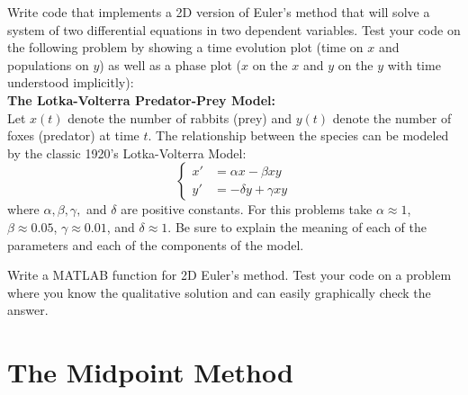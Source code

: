 \begin{problem}\label{prob:2dPredPrey}
    Write code that implements a 2D version of Euler's method that will solve a system of
    two differential equations in two dependent variables.  Test your code on the
    following problem by showing a time evolution plot (time on $x$ and populations on
    $y$) as well as a phase plot ($x$ on the $x$ and $y$ on the $y$ with time understood
    implicitly):\\
    {\bf The Lotka-Volterra Predator-Prey Model:}\\
    Let $x(t)$ denote the number of rabbits (prey) and $y(t)$ denote the number of foxes
    (predator) at time $t$.  The relationship between the species can be modeled by the
    classic 1920's Lotka-Volterra Model:
    \[ \left\{ \begin{array}{ll} x' &= \alpha x - \beta xy \\ y' &= -\delta y + \gamma xy
        \end{array} \right. \]
    where $\alpha, \beta, \gamma,$ and $\delta$ are positive constants.  For this
    problems take $\alpha \approx 1$, $\beta \approx 0.05$, $\gamma \approx 0.01$, and
    $\delta \approx 1$.  Be sure to explain the meaning of each of the parameters and each
    of the components of the model.
\end{problem}


\begin{problem}
    Write a MATLAB function for 2D Euler's method.  Test your code on a problem where you
    know the qualitative solution and can easily graphically check the answer.
\end{problem}

\newpage\section{The Midpoint Method}

